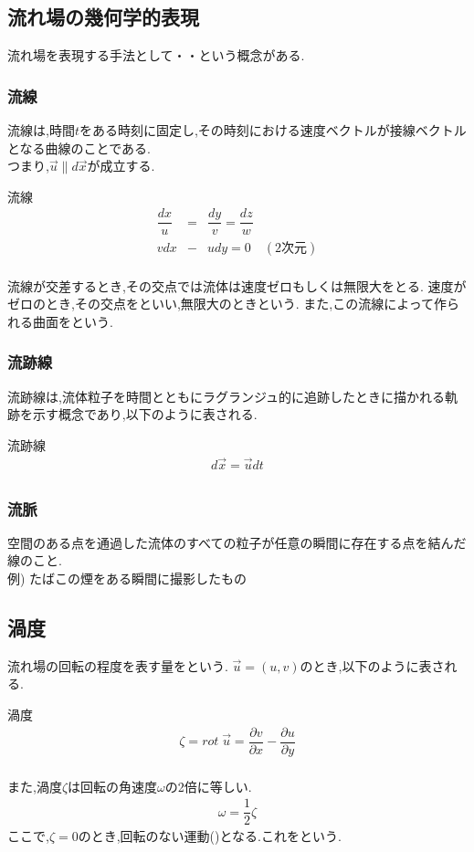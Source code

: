 \documentclass[a4paper]{jsarticle}
\begin{document}
\subsection{流れ場の幾何学的表現}
流れ場を表現する手法として・・という概念がある.\\
\subsubsection{流線}
流線は,時間$t$をある時刻に固定し,その時刻における速度ベクトルが接線ベクトルとなる曲線のことである.\\
つまり,$\vec{u}\parallel d\vec{x}$が成立する.
\begin{itembox}[l]{流線}
    \begin{eqnarray*}
        \dfrac{dx}{u}&=&\dfrac{dy}{v}=\dfrac{dz}{w}\\
        vdx&-&udy=0\quad (2次元)\\
    \end{eqnarray*}
\end{itembox}
流線が交差するとき,その交点では流体は速度ゼロもしくは無限大をとる.
速度がゼロのとき,その交点をといい,無限大のときという.
また,この流線によって作られる曲面をという.
\subsubsection{流跡線}
流跡線は,流体粒子を時間とともにラグランジュ的に追跡したときに描かれる軌跡を示す概念であり,以下のように表される.
\begin{itembox}[l]{流跡線}
    \begin{eqnarray*}
        d\vec{x}=\vec{u}dt\\
    \end{eqnarray*}
\end{itembox}
\subsubsection{流脈}
空間のある点を通過した流体のすべての粒子が任意の瞬間に存在する点を結んだ線のこと.\\
例) たばこの煙をある瞬間に撮影したもの
\subsection{渦度}
流れ場の回転の程度を表す量をという.
$\vec{u}=\left(u,v\right)$のとき,以下のように表される.
\begin{itembox}[l]{渦度}
    \begin{eqnarray*}
        \zeta = rot\;\vec{u}=\dfrac{\partial v}{\partial x}-\dfrac{\partial u}{\partial y}\\
    \end{eqnarray*}
\end{itembox}
また,渦度$\zeta$は回転の角速度$\omega$の2倍に等しい.
\begin{eqnarray*}
    \omega = \dfrac{1}{2}\zeta
\end{eqnarray*}
ここで,$\zeta=0$のとき,回転のない運動()となる.これをという.
\end{document}
